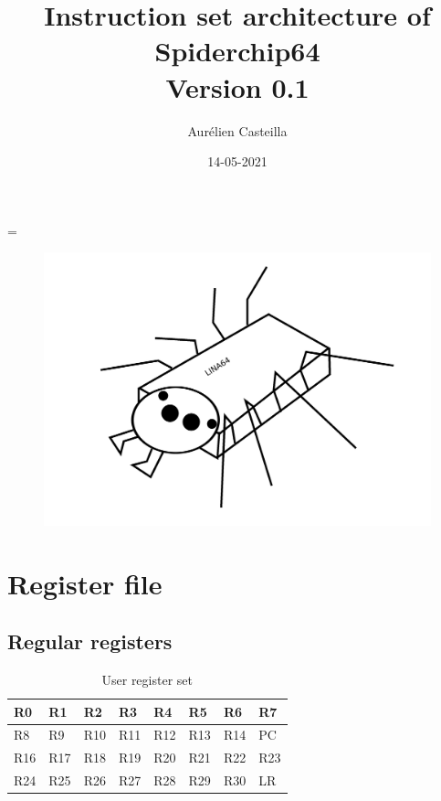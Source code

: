 \documentclass[11pt]{article}
\author{Aurélien Casteilla}
\title{Instruction set architecture of Spiderchip64 \\[1ex] \large Version 0.1}
\date{14-05-2021}
\begin{document}
\emergencystretch=\maxdimen
{}

\maketitle
\begin{figure}[h!]
    \includegraphics[width=\linewidth]{mascotte.png}
\end{figure}
\newpage

\tableofcontents
\newpage

\section{Register file}
\subsection{Regular registers}

\begin{table}[h!]
    \begin{center}
        \caption{User register set}
        \label{tab:urs}
        \begin{tabular}{|l|l|l|l|l|l|l|l|}
            \hline
            R0  & R1    & R2    & R3    & R4    & R5    & R6    & R7 \\
            \hline
            R8    & R9    & R10   & R11   & R12   & R13   & R14  & PC \\
            \hline
            R16  & R17    & R18    & R19    & R20    & R21    & R22    & R23 \\
            \hline
            R24    & R25    & R26   & R27   & R28   & R29   & R30   & LR \\
            \hline
        \end{tabular}
    \end{center}
\end{table}
\end{document}
